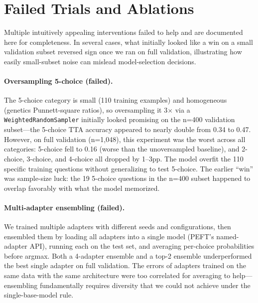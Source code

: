 \documentclass[11pt]{article}
\begin{document}
\section{Failed Trials and Ablations}

Multiple intuitively appealing interventions failed to help and are documented here for completeness. In several cases, what initially looked like a win on a small validation subset reversed sign once we ran on full validation, illustrating how easily small-subset noise can mislead model-selection decisions.

\paragraph{Oversampling 5-choice (failed).} The 5-choice category is small (110 training examples) and homogeneous (genetics Punnett-square ratios), so oversampling it 3$\times$ via a \texttt{WeightedRandomSampler} initially looked promising on the n=400 validation subset---the 5-choice TTA accuracy appeared to nearly double from 0.34 to 0.47. However, on full validation (n=1{,}048), this experiment was the worst across all categories: 5-choice fell to 0.16 (worse than the unoversampled baseline), and 2-choice, 3-choice, and 4-choice all dropped by 1--3pp. The model overfit the 110 specific training questions without generalizing to test 5-choice. The earlier ``win'' was sample-size luck: the 19 5-choice questions in the n=400 subset happened to overlap favorably with what the model memorized.

\paragraph{Multi-adapter ensembling (failed).} We trained multiple adapters with different seeds and configurations, then ensembled them by loading all adapters into a single model (PEFT's named-adapter API), running each on the test set, and averaging per-choice probabilities before argmax. Both a 4-adapter ensemble and a top-2 ensemble underperformed the best single adapter on full validation. The errors of adapters trained on the same data with the same architecture were too correlated for averaging to help---ensembling fundamentally requires diversity that we could not achieve under the single-base-model rule.
\end{document}
